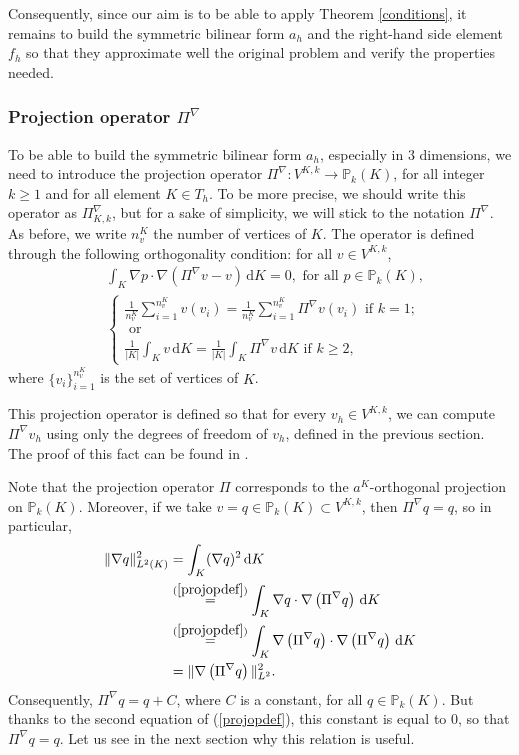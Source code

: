 Consequently, since our aim is to be able to apply Theorem \ref{conditions}, it remains to build the symmetric bilinear form $a_h$ and the right-hand side element $f_h$ so that they approximate well the original problem and verify the properties needed. 

\subsubsection{Projection operator $\Pi^\nabla$} \label{projop}

To be able to build the symmetric bilinear form $a_h$, especially in $3$ dimensions, we need to introduce the projection operator $\Pi^\nabla:V^{K,k}\rightarrow \mathbb{P}_k(K)$, for all integer $k\geq 1$ and for all element $K\in T_h$. To be more precise, we should write this operator as $\Pi^\nabla_{K,k}$, but for a sake of simplicity, we will stick to the notation $\Pi^\nabla$. As before, we write $n_v^K$ the number of vertices of $K$. The operator is defined through the following orthogonality condition: for all $v\in V^{K,k}$, 
\begin{align}
&\int_K \nabla p\cdot\nabla\left(\Pi^\nabla v - v\right) \, \mathrm{d}K = 0, \text{ for all } p\in\mathbb{P}_k(K), \label{projopdef} \\
&\begin{cases}
\frac{1}{n_v^K}\sum_{i=1}^{n_v^K} v(v_i) = \frac{1}{n_v^K}\sum_{i=1}^{n_v^K} \Pi^\nabla v(v_i) \text{ if } k=1; \nonumber \\
\text{ or }\\ 
\frac{1}{|K|}\int_{K} v \, \mathrm{d}K = \frac{1}{|K|}\int_{K} \Pi^\nabla v \, \mathrm{d}K \text{ if } k\geq 2,
\end{cases}
\end{align}
where $\{v_i\}_{i=1}^{n_v^K}$ is the set of vertices of $K$. 

This projection operator is defined so that for every $v_h\in V^{K,k}$, we can compute $\Pi^\nabla v_h$ using only the degrees of freedom of $v_h$, defined in the previous section. The proof of this fact can be found in \cite{hitchhicker}.

Note that the projection operator $\Pi$ corresponds to the $a^K$-orthogonal projection on $\mathbb{P}_k(K)$. Moreover, if we take $v=q\in\mathbb{P}_k(K)\subset V^{K,k}$, then $\Pi^\nabla q = q$, so in particular, 
\begin{align*}
\|\nabla q\|^2_{L^2(K)} &= \int_K (\nabla q)^2 \, \mathrm{d}K \\
&\stackrel{(\ref{projopdef})}{=} \int_K \nabla q \cdot \nabla\left(\Pi^\nabla q\right) \,\mathrm{d}K \\
&\stackrel{(\ref{projopdef})}{=} \int_K \nabla\left(\Pi^\nabla q\right) \cdot \nabla\left(\Pi^\nabla q\right) \,\mathrm{d}K \\
&= \|\nabla\left(\Pi^\nabla q\right)\|^2_{L^2} .
\end{align*}
Consequently, $\Pi^\nabla q = q+C$, where $C$ is a constant, for all $q\in\mathbb{P}_k(K)$. But thanks to the second equation of (\ref{projopdef}), this constant is equal to $0$, so that $\Pi^\nabla q = q$. Let us see in the next section why this relation is useful. 

